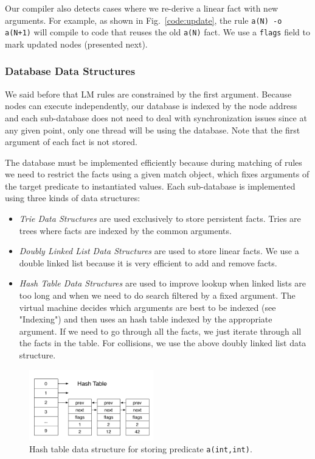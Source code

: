 Our compiler also detects cases where we re-derive a linear fact with new arguments.
For example, as shown in Fig.~\ref{code:update}, the rule \texttt{a(N) -o a(N+1)}
will compile to code that reuses the old \texttt{a(N)} fact.
We use a \texttt{flags} field to mark updated nodes (presented next).

\subsubsection{Database Data Structures}\label{sec:database}

We said before that LM rules are constrained by the first argument. Because nodes can execute
independently, our database is indexed by the node address and each sub-database does not
need to deal with synchronization issues since at any given point, only one thread will be using
the database. Note that the first argument of each fact is not stored.

The database must be implemented efficiently because during matching of rules we need
to restrict the facts using a given match object, which fixes arguments of the target predicate to instantiated values.
Each sub-database is implemented using three kinds of data structures:

\begin{itemize}
   \item \emph{Trie Data Structures} are used exclusively to store persistent facts.
   Tries are trees where facts are indexed by the common arguments.
      
   \item \emph{Doubly Linked List Data Structures} are used to store linear facts.
   We use a double linked list because it is very efficient to add and remove facts.
   
   \item \emph{Hash Table Data Structures} are used to improve lookup when linked lists are too long and when we need to do search filtered by a fixed argument. The virtual machine decides which arguments are best to be indexed
   (see "Indexing") and then
   uses an hash table indexed by the appropriate argument. If we need to go through all the facts, we just iterate through all the facts in the table. For collisions, we use the above doubly linked list data structure.
\end{itemize}

\begin{figure}
   \vspace{-1\intextsep}
   \centering
   \includegraphics[width=0.48\textwidth]{hash_table.pdf}
   \caption{\small{Hash table data structure for storing predicate \texttt{a(int,int)}.}}
   \label{fig:hash_table}
   \vspace{-0.5\intextsep}
\end{figure}

